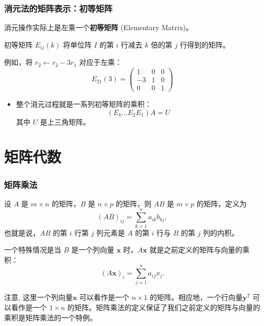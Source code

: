 
\begin{frame}
\frametitle{消元法的矩阵表示：初等矩阵}

消元操作实际上是左乘一个\textbf{初等矩阵} (Elementary Matrix)。

\begin{block}{初等矩阵 $E_{ij}(k)$}
将单位阵 $I$ 的第 $i$ 行减去 $k$ 倍的第 $j$ 行得到的矩阵。
\end{block}

例如，将 $r_2 \leftarrow r_2 - 3r_1$ 对应于左乘：
\[
E_{21}(3) = \begin{pmatrix} 1 & 0 & 0 \\ -3 & 1 & 0 \\ 0 & 0 & 1 \end{pmatrix}
\]

\begin{itemize}
    \item 整个消元过程就是一系列初等矩阵的乘积：
    \[
    (E_k \dots E_2 E_1) A = U
    \]
    其中 $U$ 是上三角矩阵。
\end{itemize}

\end{frame}


\section{矩阵代数}


\begin{frame}
\frametitle{矩阵乘法}

\begin{Def}[矩阵乘法]
设 $A$ 是 $m \times n$ 的矩阵，$B$ 是 $n \times p$ 的矩阵，则 $AB$ 是 $m \times p$ 的矩阵，定义为
\[(AB)_{ij} = \sum_{k=1}^n a_{ik} b_{kj},\]
也就是说，$AB$ 的第 $i$ 行第 $j$ 列元素是 $A$ 的第 $i$ 行与 $B$ 的第 $j$ 列的内积。
\end{Def}

一个特殊情况是当 $B$ 是一个列向量 $\mathbf{x}$ 时，$A\mathbf{x}$ 就是之前定义的矩阵与向量的乘积：
\[
(A\mathbf{x})_i = \sum_{j=1}^n a_{ij} x_j.
\]

注意, 这里一个列向量$\mathbf{x}$ 可以看作是一个 $n \times 1$ 的矩阵。相应地，一个行向量$\mathbf{y}^T$ 可以看作是一个 $1 \times n$ 的矩阵。矩阵乘法的定义保证了我们之前定义的矩阵与向量的乘积是矩阵乘法的一个特例。

\end{frame}

